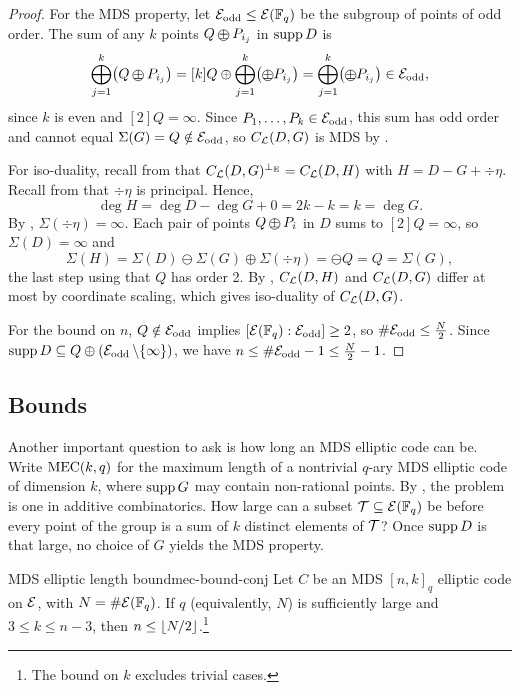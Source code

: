 \documentclass[twocolumn, 11pt]{scrartcl}
\begin{document}
\begin{proof}
For the MDS property, let $\mathcal{E}_\mathrm{odd}\leq\mathcal{E}(\mathbb{F}_q)$ be the subgroup of points of odd order. The sum of any $k$ points $Q\opm P_{i_j}$ in $\operatorname{supp} D$ is
\vspace{-3pt}
\[ \bigoplus_{j=1}^k \pa[\big]{Q\opm P_{i_j}}=[k]Q\oplus\bigoplus_{j=1}^k \pa[\big]{\opm P_{i_j}}=\bigoplus_{j=1}^k \pa[\big]{\opm P_{i_j}}\in\mcE_\mathrm{odd}, \]
since $k$ is even and $[2]Q=\infty$. Since $P_1,\hdots,P_k\in\mathcal{E}_\mathrm{odd}$, this sum has odd order and cannot equal $\Sigma(G)=Q\notin\mathcal{E}_\mathrm{odd}$, so $C_\mathcal{L}(D,G)$ is MDS by .

For iso-duality, recall from  that $C_\mathcal{L}(D,G)^{\perp_\mathrm{E}}=C_\mathcal{L}(D,H)$ with $H=D-G+\div\eta$. Recall from  that $\div\eta$ is principal. Hence,
\[ \deg H=\deg D-\deg G+0=2k-k=k=\deg G. \]
By , $\Sigma(\div\eta)=\infty$. Each pair of points $Q\opm P_i$ in $D$ sums to $[2]Q=\infty$, so $\Sigma(D)=\infty$ and
\[ \Sigma(H)=\Sigma(D)\ominus\Sigma(G)\oplus\Sigma(\div\eta)=\ominus Q=Q=\Sigma(G), \]
the last step using that $Q$ has order 2. By , $C_\mathcal{L}(D,H)$ and $C_\mathcal{L}(D,G)$ differ at most by coordinate scaling, which gives iso-duality of $C_\mathcal{L}(D,G)$.

For the bound on $n$, $Q\notin\mathcal{E}_\mathrm{odd}$ implies $[\mathcal{E}(\mathbb{F}_q):\mathcal{E}_\mathrm{odd}]\geq2$, so $\#\mathcal{E}_\mathrm{odd}\leq \frac N2$. Since $\operatorname{supp} D\subseteq Q\oplus(\mathcal{E}_\mathrm{odd}\operatorname{\setminus}\{\infty\})$, we have $n\leq\#\mathcal{E}_\mathrm{odd}-1\leq \frac N2-1$.
\end{proof}

\subsection{Bounds}

Another important question to ask is how long an MDS elliptic code can be. Write $\operatorname{MEC}(k,q)$ for the maximum length of a nontrivial $q$-ary MDS elliptic code of dimension $k$, where $\operatorname{supp} G$ may contain non-rational points. By , the problem is one in additive combinatorics. How large can a subset $\mathcal{T}\subseteq\mathcal{E}(\mathbb{F}_q)$ be before every point of the group is a sum of $k$ distinct elements of $\mathcal{T}$? Once $\operatorname{supp} D$ is that large, no choice of $G$ yields the MDS property.

\begin{conjecture}{MDS elliptic length bound}{mec-bound-conj}
    Let $C$ be an MDS $[n,k]_q$ elliptic code on $\mathcal{E}$, with $N=\#\mathcal{E}(\mathbb{F}_q)$. If $q$ (equivalently, $N$) is sufficiently large and $3\leq k\leq n-3$, then $n\leq\lfloor N/2\rfloor$.\footnote{The bound on $k$ excludes trivial cases.}
\end{conjecture}
\end{document}
